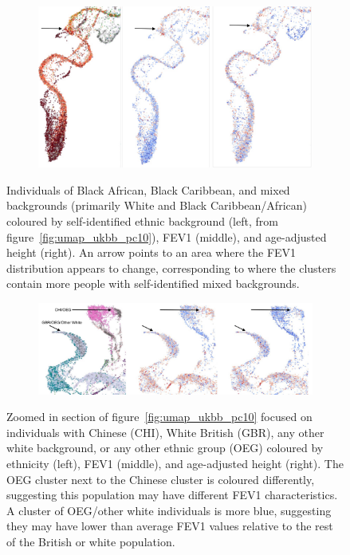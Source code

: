 \documentclass[12pt]{pnas-new}
\begin{document}
\begin{figure}
    \centering
    \begin{subfigure}{\textwidth}
    \includegraphics[width=\textwidth]{images/montage_fev1_height_afr_permuted.pdf}
    \end{subfigure}
    \caption{Individuals of Black African, Black Caribbean, and mixed backgrounds (primarily White and Black Caribbean/African) coloured by self-identified ethnic background (left, from figure~\ref{fig:umap_ukbb_pc10}), FEV1 (middle), and age-adjusted height (right). An arrow points to an area where the FEV1 distribution appears to change, corresponding to where the clusters contain more people with self-identified mixed backgrounds.}
    \label{fig:supp_comparison_fev_afr}
\end{figure}

\begin{figure}
    \centering
    \begin{subfigure}{\textwidth}
    \includegraphics[width=\textwidth]{images/montage_fev1_height_chi_eur_permuted.pdf}
    \end{subfigure}
    \caption{Zoomed in section of figure~\ref{fig:umap_ukbb_pc10} focused on individuals with Chinese (CHI), White British (GBR), any other white background, or any other ethnic group (OEG) coloured by ethnicity (left), FEV1 (middle), and age-adjusted height (right). The OEG cluster next to the Chinese cluster is coloured differently, suggesting this population may have different FEV1 characteristics. A cluster of OEG/other white individuals is more blue, suggesting they may have lower than average FEV1 values relative to the rest of the British or white population.}
    \label{fig:supp_comparison_fev_chi_eur}
\end{figure}
\end{document}
